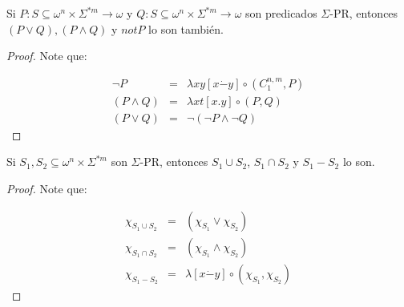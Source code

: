   \begin{lemma}
    \par Si $P: S \subseteq \omega^{n} \times \Sigma^{\ast m} \rightarrow \omega$ y $Q: S \subseteq \omega^{n} \times
    \Sigma^{\ast m} \rightarrow \omega$ son predicados $\Sigma$-PR, entonces $(P \vee Q), (P \wedge Q)$ y $not P$ lo son
    también.
  \end{lemma}
  \begin{proof}
    \par Note que:

    \begin{eqnarray}
      \nonumber \neg P &=& \lambda xy \left[x \dot{-} y\right] \circ (C_{1}^{n, m}, P) \\
      \nonumber (P \wedge Q) &=& \lambda xt \left[x.y\right] \circ (P, Q) \\
      \nonumber (P \vee Q) &=& \neg (\neg P \wedge \neg Q)
    \end{eqnarray}
  \end{proof}

  \begin{lemma}
    \par Si $S_{1}, S_{2} \subseteq \omega^{n} \times \Sigma^{\ast m}$ son $\Sigma$-PR, entonces $S_{1} \cup S_{2}$,
    $S_{1} \cap S_{2}$ y $S_{1} - S_{2}$ lo son.
  \end{lemma}
  \begin{proof}
    \par Note que:

    \begin{eqnarray}
      \nonumber \chi_{S_{1} \cup S_{2}} &=& (\chi_{S_{1}} \vee \chi_{S_{2}}) \\
      \nonumber \chi_{S_{1} \cap S_{2}} &=& (\chi_{S_{1}} \wedge \chi_{S_{2}}) \\
      \nonumber \chi_{S_{1} - S_{2}} &=& \lambda \left[x \dot{-} y\right] \circ (\chi_{S_{1}}, \chi_{S_{2}})
    \end{eqnarray}
  \end{proof}


